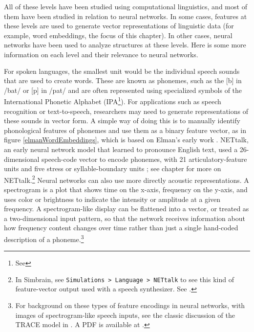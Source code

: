 All of these levels have been studied using computational linguistics, and most of them have been studied in relation to neural networks. In some cases, features at these levels are used to generate vector representations of linguistic data (for example, word embeddings, the focus of this chapter). In other cases, neural networks have been used to analyze structures at these levels. Here is some more information on each level and their relevance to neural networks.

For spoken languages, the smallest unit would be the individual speech sounds that are used to create words. These are known as phonemes, such as the [b] in /bat/ or [p] in /pat/ and are often represented using specialized symbols of the International Phonetic Alphabet (IPA\footnote{See }). For applications such as speech recognition or text-to-speech, researchers may need to generate representations of these sounds in vector form. A simple way of doing this is to manually identify phonological features of phonemes and use them as a binary feature vector, as in figure \ref{elmanWordEmbeddings}, which is based on Elman's early work \cite{elman1990finding}. NETtalk, an early neural network model that learned to pronounce English text, used a 26-dimensional speech-code vector to encode phonemes, with 21 articulatory-feature units and five stress or syllable-boundary units \cite{sejnowski1987parallel}; see chapter  for more on NETtalk.\footnote{In Simbrain, see \texttt{Simulations > Language > NETtalk} to see this kind of feature-vector output used with a speech synthesizer. See .} Neural networks can also use more directly acoustic representations. A spectrogram is a plot that shows time on the x-axis, frequency on the y-axis, and uses color or brightness to indicate the intensity or amplitude at a given frequency. A spectrogram-like display can be flattened into a vector, or treated as a two-dimensional input pattern, so that the network receives information about how frequency content changes over time rather than just a single hand-coded description of a phoneme.\footnote{For background on these types of feature encodings in neural networks, with images of spectrogram-like speech inputs, see the classic discussion of the TRACE model in \cite{mcclelland1986interactive}. A PDF is available at .}

